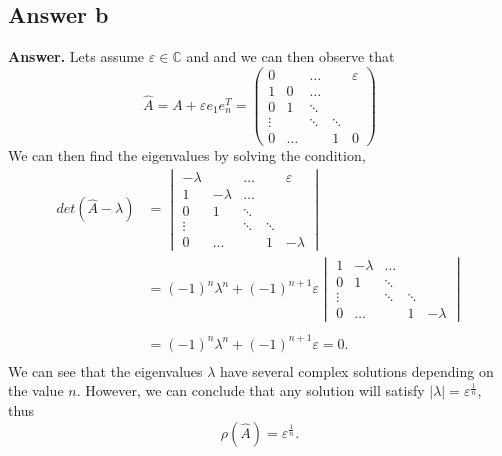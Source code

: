 \documentclass{article}
\theoremstyle{remark}
\begin{document}
    \subsection{Answer b}%
\label{sub:answer_b_}


    \textbf{Answer.} 
    Lets assume $\varepsilon \in \mathbb{C}  $ and and we can then observe that \[
    \hat{A} = A + \varepsilon e_{1}e_{n}^{T} = \begin{pmatrix}
    0    &   &  \ldots           &    &  \varepsilon  \\
    1  & 0  &  \ldots \\
    0  &  1  & \ddots  \\
    \vdots   &   &  \ddots   &  \ddots   & \\
     0  &  \ldots  &   &  1  & 0
    \end{pmatrix} 
    \] 
    We can then find the eigenvalues by solving the condition, \[
      \begin{split}
    det \left(  \hat{A} - \lambda \right)  & = \begin{vmatrix}
    -\lambda     &   &  \ldots           &    &  \varepsilon  \\
    1  & -\lambda   &  \ldots \\
    0  &  1  & \ddots  \\
    \vdots   &   &  \ddots   &  \ddots   & \\
     0  &  \ldots  &   &  1  & -\lambda 
    \end{vmatrix}  \\
    &=  \left( -1 \right)^{n} \lambda ^{n}  + \left( -1 \right)^{n+1}\varepsilon 
     \begin{vmatrix}
    1  & -\lambda   &  \ldots \\
    0  &  1  & \ddots  \\
    \vdots   &   &  \ddots   &  \ddots   & \\
     0  &  \ldots  &   &  1  & -\lambda 
    \end{vmatrix}  \\
     \\
     &=  \left( -1 \right)^{n} \lambda ^{n} + \left( -1 \right)^{n+1}\varepsilon  = 0 .  \\
      \end{split} 
    \] 
    We can see that the eigenvalues $\lambda $ have several complex solutions depending on the value $n$. However, we can conclude that any solution will satisfy $\left\lvert \lambda  \right\rvert = \varepsilon ^{\frac{1}{n}}$, thus
     \[
    \rho \left( \hat{A} \right) = \varepsilon ^{\frac{1}{n}}.
    \] 
\end{document}
